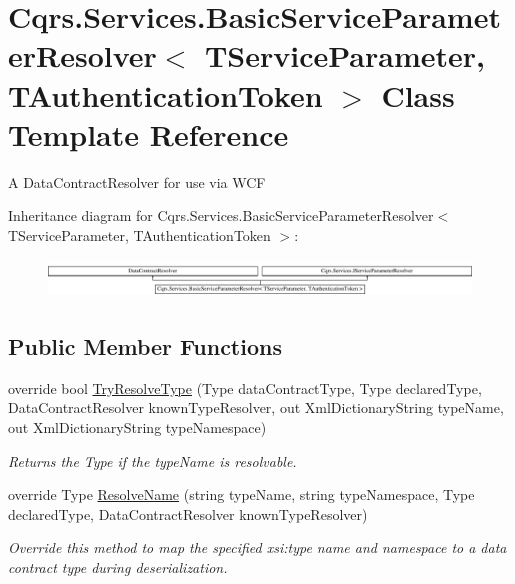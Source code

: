 \hypertarget{classCqrs_1_1Services_1_1BasicServiceParameterResolver}{}\section{Cqrs.\+Services.\+Basic\+Service\+Parameter\+Resolver$<$ T\+Service\+Parameter, T\+Authentication\+Token $>$ Class Template Reference}
\label{classCqrs_1_1Services_1_1BasicServiceParameterResolver}


A Data\+Contract\+Resolver for use via W\+CF  


Inheritance diagram for Cqrs.\+Services.\+Basic\+Service\+Parameter\+Resolver$<$ T\+Service\+Parameter, T\+Authentication\+Token $>$\+:\begin{figure}[H]
\begin{center}
\leavevmode
\includegraphics[height=1.018182cm]{classCqrs_1_1Services_1_1BasicServiceParameterResolver}
\end{center}
\end{figure}
\subsection*{Public Member Functions}
\begin{DoxyCompactItemize}
\item 
override bool \hyperlink{classCqrs_1_1Services_1_1BasicServiceParameterResolver_adbc4b10f8931db30768d7ca84bdb0260_adbc4b10f8931db30768d7ca84bdb0260}{Try\+Resolve\+Type} (Type data\+Contract\+Type, Type declared\+Type, Data\+Contract\+Resolver known\+Type\+Resolver, out Xml\+Dictionary\+String type\+Name, out Xml\+Dictionary\+String type\+Namespace)
\begin{DoxyCompactList}\small\item\em Returns the Type if the {\itshape type\+Name}  is resolvable. \end{DoxyCompactList}\item 
override Type \hyperlink{classCqrs_1_1Services_1_1BasicServiceParameterResolver_a8c598f2f49a83190c315afc88e5630d5_a8c598f2f49a83190c315afc88e5630d5}{Resolve\+Name} (string type\+Name, string type\+Namespace, Type declared\+Type, Data\+Contract\+Resolver known\+Type\+Resolver)
\begin{DoxyCompactList}\small\item\em Override this method to map the specified xsi\+:type name and namespace to a data contract type during deserialization. \end{DoxyCompactList}\end{DoxyCompactItemize}
